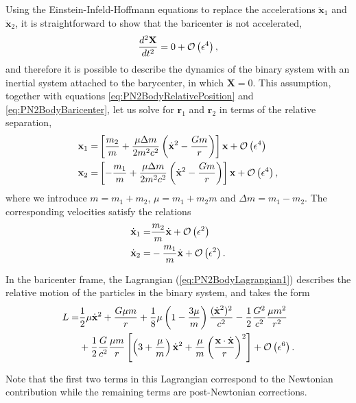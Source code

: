 Using the Einstein-Infeld-Hoffmann equations to replace the accelerations $\ddot{\textbf{x}}_1$ and $\ddot{\textbf{x}}_2$, it is straightforward to show that the baricenter is not accelerated,
\begin{equation}
\frac{d^2 \textbf{X}}{dt^2} = 0 + {\mathcal{O}} \left( \epsilon^4 \right),
\end{equation}
and therefore it is possible to describe the dynamics of the binary system with an inertial system attached to the barycenter, in which  $\textbf{X} = 0$. This assumption, together with equations \ref{eq:PN2BodyRelativePosition} and \ref{eq:PN2BodyBaricenter}, let us solve for $\textbf{r}_1$ and $\textbf{r}_2$ in terms of the relative separation,
\begin{align}
\textbf{x}_1 = & \left[ \frac{m_2}{m} + \frac{\mu \Delta m}{2m^2 c^2} \left( \dot{\textbf{x}}^2 - \frac{Gm}{r} \right) \right] \textbf{x} + {\mathcal{O}} \left( \epsilon^4 \right) \\
\textbf{x}_2 = & \left[ -\frac{m_1}{m}  + \frac{\mu \Delta m}{2m^2 c^2} \left( \dot{\textbf{x}}^2 - \frac{Gm}{r} \right) \right] \textbf{x} + {\mathcal{O}} \left( \epsilon^4 \right),
\end{align}
where we introduce $m=m_1 + m_2$, $\mu = {m_1 + m_2}{m}$ and $\Delta m= m_1 - m_2 $. The corresponding velocities satisfy the relations
\begin{align}
\dot{\textbf{x}}_1 = & \frac{m_2}{m} \dot{\textbf{x}} + {\mathcal{O}} \left( \epsilon^2 \right) \\
\dot{\textbf{x}}_2 = & - \frac{m_1}{m} \dot{\textbf{x}} + {\mathcal{O}} \left( \epsilon^2 \right) .
\end{align}

In the baricenter frame, the Lagrangian (\ref{eq:PN2BodyLagrangian1}) describes the relative motion of the particles in the binary system, and takes the form
\begin{align}
L = &\frac{1}{2} \mu \dot{\textbf{x}}^2 + \frac{G \mu m}{r} + \frac{1}{8} \mu \left( 1 - \frac{3\mu}{m} \right) \frac{(\dot{\textbf{x}}^2)^2}{c^2} - \frac{1}{2} \frac{G^2}{c^2} \frac{\mu m^2}{r^2} \notag \\
& + \frac{1}{2} \frac{G}{c^2} \frac{\mu m}{r} \left[ \left( 3 + \frac{\mu }{m}\right) \dot{\textbf{x}}^2 + \frac{\mu }{m} \left( \frac{\textbf{x} \cdot \dot{\textbf{x}}}{r} \right)^2 \right]  + {\mathcal{O}} \left( \epsilon^6 \right) . \label{eq:PNBinaryLagrangian}
\end{align}

Note that the first two terms in this Lagrangian correspond to the Newtonian contribution while the remaining terms are post-Newtonian corrections. 

